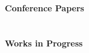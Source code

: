 \begin{NoHyper}
  \noindent\textbf{Conference Papers}\\[0.2em]
  \noindent{}\\[1em]
  \noindent{}\\[1em]


  \noindent\textbf{Works in Progress}\\[0.2em]
  \noindent{}\\[1em]
  \noindent{}
\end{NoHyper}

